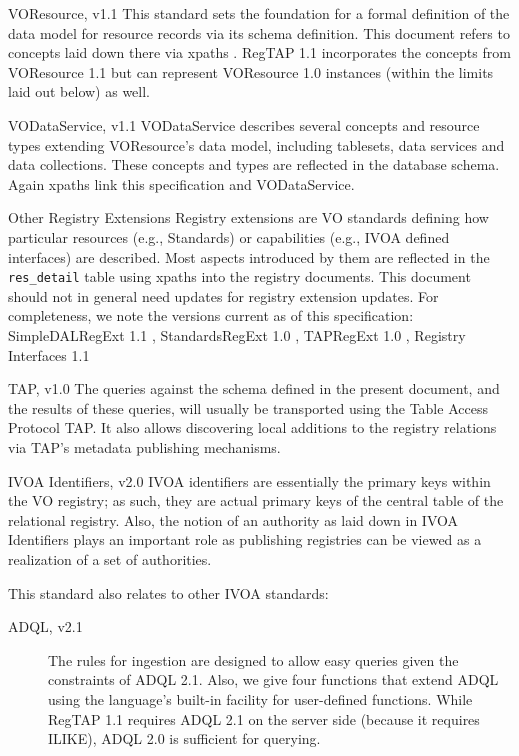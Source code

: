 \documentclass[11pt,a4paper]{ivoa}
\newcommand{\rtent}[1]{\texttt{\color{rtcolor} #1}}
\begin{document}
\begin{bigdescription}
\item[VOResource, v1.1 \citep{2018ivoa.spec.0625P}] This standard
sets the foundation for a formal definition of the data
model for resource records via its schema definition.  This document
refers to concepts laid down there via xpaths \citep{std:XPATH}.  RegTAP
1.1 incorporates the concepts from VOResource 1.1 but can represent
VOResource 1.0 instances (within the limits laid out below) as well.
\item[VODataService, v1.1 \citep{std:VODS11}] VODataService 
de\-scribes several concepts and resource types extending 
VOResource's data model, including
tablesets, data services and data
collections.  These concepts and types are reflected in the database
schema.  Again xpaths link this specification and VODataService.
\item[Other Registry Extensions]Registry extensions are VO standards
defining how particular resources (e.g., Standards) or capabilities
(e.g., IVOA defined interfaces) are described.  Most aspects
introduced by them are reflected in the \rtent{res\_detail} table using
xpaths into the registry documents.
This document should not in general need updates
for registry extension updates.  For completeness, we note the
versions current as of this specification: SimpleDALRegExt 1.1
\citep{2017ivoa.spec.0530P},
StandardsRegExt 1.0 \citep{std:STDREGEXT}, TAPRegExt 1.0
\citep{std:TAPREGEXT}, Registry Interfaces 1.1
\citep{2018ivoa.spec.0723D}
\item[TAP, v1.0 \citep{std:TAP}]The queries against the schema defined in the present document, and the results of
these queries, will usually be transported using the Table Access
Protocol TAP.  It also allows discovering
local additions to the registry relations via TAP's metadata publishing
mechanisms.
\item[IVOA Identifiers, v2.0 \citep{2016ivoa.spec.0523D}]IVOA identifiers are
essentially the primary keys within the VO
registry; as such, they are actual primary keys of the central table of
the relational registry. Also, the notion of an authority as laid down
in IVOA Identifiers plays an important role as publishing registries can
be viewed as a realization of a set of authorities.

\end{bigdescription}

This standard also relates to other IVOA standards:


\begin{description}
\item[ADQL, v2.1 \citep{TODO}]The rules for ingestion are designed to allow
easy queries given the constraints of ADQL 2.1.  Also,
we give four functions that extend ADQL using the
language's built-in facility for user-defined functions.  While RegTAP
1.1 requires ADQL 2.1 on the server side (because it requires ILIKE),
ADQL 2.0 is sufficient for querying.
\end{description}
\end{document}
